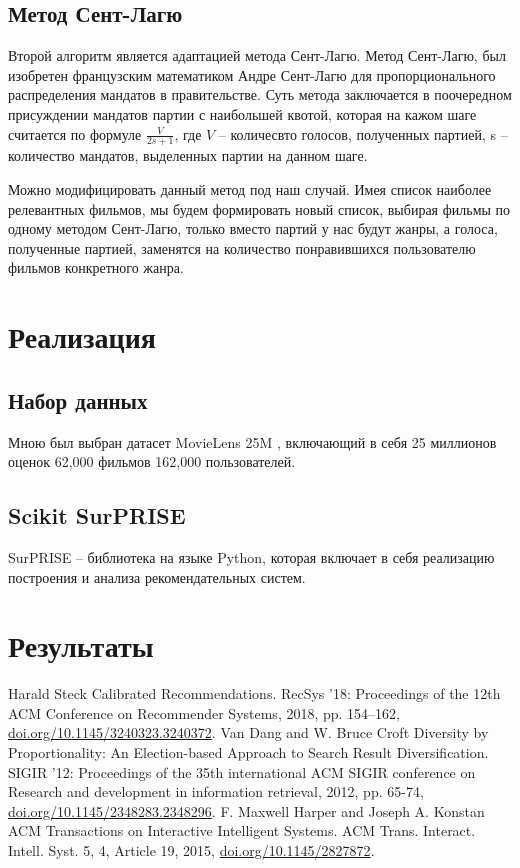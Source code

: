 \documentclass[a4paper,article,14pt]{extarticle}
\begin{document}
\subsection{Метод Сент-Лагю}
Второй алгоритм является адаптацией метода Сент-Лагю. \cite{voc2} Метод Сент-Лагю, был изобретен французским математиком Андре Сент-Лагю для пропорционального распределения мандатов в правительстве. Суть метода заключается в поочередном присуждении мандатов партии с наибольшей квотой, которая на кажом шаге считается по формуле $\frac{V}{2s+1}$, где $V$ -- количесвто голосов, полученных партией, s -- количество мандатов, выделенных партии на данном шаге.

Можно модифицировать данный метод под наш случай. Имея список наиболее релевантных фильмов, мы будем формировать новый список, выбирая фильмы по одному методом Сент-Лагю, только вместо партий у нас будут жанры, а голоса, полученные партией, заменятся на количество понравившихся пользователю фильмов конкретного жанра.
\section{Реализация}
\subsection{Набор данных}
Мною был выбран датасет MovieLens 25M \cite{voc3}, включающий в себя 25 миллионов оценок 62,000 фильмов 162,000 пользователей.
\subsection{Scikit SurPRISE}
SurPRISE -- библиотека на языке Python, которая включает в себя реализацию построения и анализа рекомендательных систем. 


\pagebreak
\section{Результаты}

\pagebreak
\begin{thebibliography}{1}
 Harald Steck \flqq Calibrated Recommendations\frqq. RecSys '18: Proceedings of the 12th ACM Conference on Recommender Systems, 2018, pp. 154–162, \href{https://doi.org/10.1145/3240323.3240372}{doi.org/10.1145/3240323.3240372}.
 Van Dang and W. Bruce Croft \flqq Diversity by Proportionality: An Election-based Approach to Search Result Diversification\frqq. SIGIR '12: Proceedings of the 35th international ACM SIGIR conference on Research and development in information retrieval, 2012, pp. 65-74, \href{https://doi.org/10.1145/2348283.2348296}{doi.org/10.1145/2348283.2348296}.
 F. Maxwell Harper and Joseph A. Konstan \flqq ACM Transactions on Interactive Intelligent Systems\frqq. ACM Trans. Interact. Intell. Syst. 5, 4, Article 19, 2015, \href{https://doi.org/10.1145/2827872}{doi.org/10.1145/2827872}.
\end{thebibliography}
\end{document}
